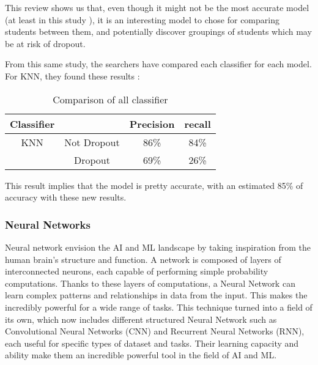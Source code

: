 \documentclass[conference]{IEEEtran}
\begin{document}
This review shows us that, even though it  might not be the most accurate model (at least in this study \cite{shiful_machine_2021}), it is an interesting model to chose for comparing students between them, and potentially discover groupings of students which may be at risk of dropout.

From this same study, the searchers have compared each classifier for each model. For KNN, they found these results :
\begin{table}[H]
    \centering
    \caption{Comparison of all classifier\cite{shiful_machine_2021}}
    \begin{tabular}{|c|c|c|c|}
        \hline
        \textbf{Classifier} & & \textbf{Precision} & \textbf{recall}\\
        \hline
        KNN & Not Dropout & 86\% & 84\% \\
        \cline{2-4} 
        & Dropout & 69\% & 26\% \\
        \hline
    \end{tabular}
    \label{tab:compar_classifier_shiful}
\end{table}

This result implies that the model is pretty accurate, with an estimated 85\% of accuracy with these new results.

\vspace{8pt}
\subsubsection{Neural Networks}
Neural network envision the AI and ML landscape by taking inspiration from the human brain's structure and function. A network is composed of layers of interconnected neurons, each capable of performing simple probability computations. Thanks to these layers of computations, a Neural Network can learn complex patterns and relationships in data from the input. This makes the incredibly powerful for a wide range of tasks. 
This technique turned into a field of its own, which now includes different structured Neural Network such as Convolutional Neural Networks (CNN) and Recurrent Neural Networks (RNN), each useful for specific types of dataset and tasks. Their learning capacity and ability make them an incredible powerful tool in the field of AI and ML. 
\end{document}
